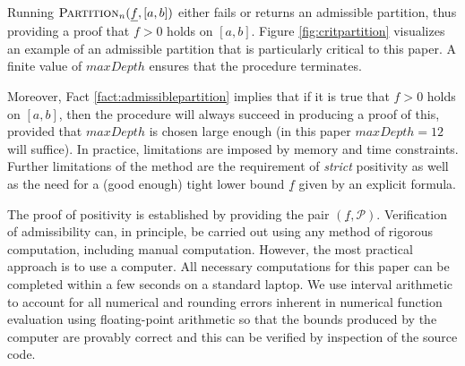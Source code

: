 \documentclass[12pt]{amsart}
\theoremstyle{plain}
\theoremstyle{definition}
\theoremstyle{remark}
\numberwithin{equation}{section}
\begin{document}
Running $\textsc{Partition$_n$}(\underline{f},[a,b])$ either fails or returns an admissible partition, thus providing a proof that $f>0$ holds on $[a,b]$. Figure \ref{fig:critpartition} visualizes an example of an admissible partition that is particularly critical to this paper.
A finite value of $maxDepth$ ensures that the procedure terminates.

Moreover, Fact \ref{fact:admissiblepartition} implies that if it is true that $f>0$ holds on $[a,b]$, then the procedure will always succeed in producing a proof of this, provided that $maxDepth$ is chosen large enough (in this paper  $maxDepth=12$ will suffice). In practice, limitations are imposed by memory and time constraints.
Further limitations of the method are the requirement of \emph{strict} positivity as well as the need for a (good enough) tight lower bound $\underline{f}$ given by an explicit formula.

The proof of positivity is established by providing the pair $(\underline{f}, \mathcal{P})$. Verification of admissibility can, in principle, be carried out using any method of rigorous computation, including manual computation. However, the most practical approach is to use a computer. All necessary computations for this paper can be completed within a few seconds on a standard laptop. We use interval arithmetic to account for all numerical and rounding errors inherent in numerical function evaluation using floating-point arithmetic so that the bounds produced by the computer are provably correct and this can be verified by inspection of the source code.
\end{document}
